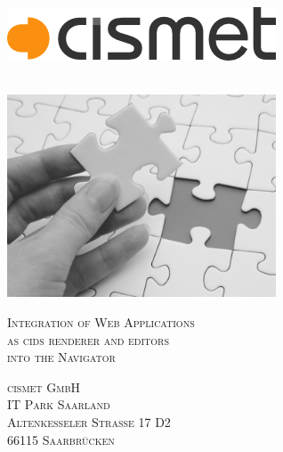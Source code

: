 \begin{titlepage}
\AddToShipoutPicture*{\BackgroundPic}
\hfill
\begin{minipage}[t]{0.5\textwidth}
	\begin{flushright}
	\includegraphics[width=\textwidth]{preamble/img/logo_cismet_grey}
	\end{flushright}
\end{minipage}
~\\[1cm]
\includegraphics[width=0.6\textwidth]{preamble/img/puzzleGrey}
~\\[1cm]

\begin{flushright}
\textsc{\Large Integration of Web Applications\\ as cids renderer and editors\\[4mm]into the Navigator}

\vfill

\textsc{cismet GmbH}
\\[0.5cm]
\textsc{IT Park Saarland}\\
\textsc{Altenkesseler Straße 17 D2}\\
\textsc{66115 Saarbrücken}\\
\end{flushright}


\end{titlepage}
\restoregeometry

